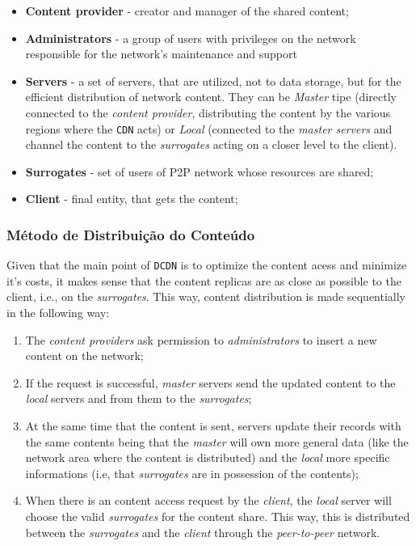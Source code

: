 \documentclass{article}
\begin{document}
\begin{itemize}
\item \textbf{Content provider} - creator and manager of the shared content;

\item \textbf{Administrators} - a group of users with privileges on the 
network responsible for the network's maintenance and support

\item \textbf{Servers} - a set of servers, that are utilized, not to
data storage, but for the efficient distribution of network content.
They can be \emph{Master} tipe (directly connected to the
\emph{content provider}, distributing the content by the various regions
where the \texttt{CDN} acts) or \emph{Local} (connected to the 
\emph{master servers} and  channel the content to the \emph{surrogates}
acting on a closer level to the client).

\item \textbf{Surrogates} - set of users of P2P network whose
resources are shared;

\item \textbf{Client} - final entity, that gets the content;

\end{itemize}



\subsubsection{Método de Distribuição do Conteúdo}

Given that the main point of \texttt{DCDN} is to optimize the content acess
and minimize it's costs, it makes sense that the content replicas
are as close as possible to the client, i.e., on the \emph{surrogates}.
This way, content distribution is made sequentially in the following way:
\begin{enumerate}

\item The \emph{content providers} ask permission to 
\emph{administrators} to insert a new content on the network;

\item If the request is successful, \emph{master} servers send
the updated content to the \emph{local} servers and from them to 
the \emph{surrogates};

\item At the same time that the content is sent, servers update their
records with the same contents being that the \emph{master} will own more general data
(like the network area where the content is distributed) 
and the \emph{local} more specific informations (i.e, that \emph{surrogates}
are in possession of the contents);

\item When there is an content access request by the 
\emph{client}, the \emph{local} server will choose the valid \emph{surrogates}
for the content share. This way, this is distributed between the
\emph{surrogates} and the \emph{client} through the \emph{peer-to-peer} network.
\end{enumerate}
\end{document}
